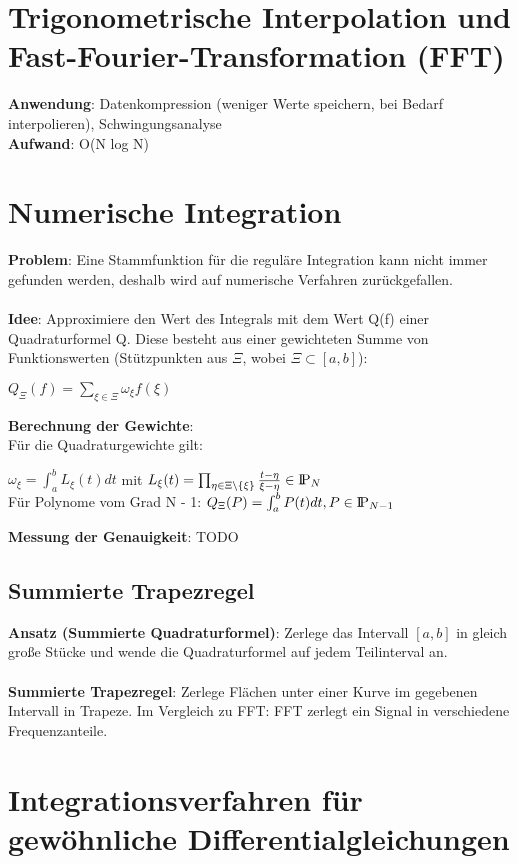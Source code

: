 \documentclass[10pt,a4paper]{article}
\def\polynomials{{\rm I\!P}}
\begin{document}
	\section{Trigonometrische Interpolation und Fast-Fourier-Transformation (FFT)}
	\textbf{Anwendung}: Datenkompression (weniger Werte speichern, bei Bedarf interpolieren), Schwingungsanalyse\\
	\textbf{Aufwand}: O(N log N)
	
	\section{Numerische Integration}
	\textbf{Problem}: Eine Stammfunktion für die reguläre Integration kann nicht immer gefunden werden, deshalb wird auf numerische Verfahren zurückgefallen.\\\\
	\textbf{Idee}: Approximiere den Wert des Integrals mit dem Wert Q(f) einer Quadraturformel Q. Diese besteht aus einer gewichteten Summe von Funktionswerten (Stützpunkten aus $\Xi$, wobei $\Xi \subset [a, b]$):
	\begin{center}
		$Q_\Xi(f) = \sum_{\xi \in \Xi}^{}\omega_\xi f(\xi)$
	\end{center}
	\textbf{Berechnung der Gewichte}:\\
	Für die Quadraturgewichte gilt:
	\begin{center}
		$\omega_\xi = \int_{a}^{b}L_\xi(t)dt$ mit $L_\xi(t) = \prod_{\eta \in \Xi \setminus \{\xi\}}^{} \frac{t - \eta}{\xi - \eta} \in \polynomials_N$\\
		Für Polynome vom Grad N - 1: $Q_\Xi(P) = \int_{a}^{b}P(t)dt, P \in \polynomials_{N - 1}$
	\end{center}
	\textbf{Messung der Genauigkeit}: TODO\\
	
	\subsection{Summierte Trapezregel}
	\textbf{Ansatz (Summierte Quadraturformel)}: Zerlege das Intervall $[a, b]$ in gleich große Stücke und wende die Quadraturformel auf jedem Teilinterval an.\\\\
	\textbf{Summierte Trapezregel}: Zerlege Flächen unter einer Kurve im gegebenen Intervall in Trapeze. Im Vergleich zu FFT: FFT zerlegt ein Signal in verschiedene Frequenzanteile.
	
	\section{Integrationsverfahren für gewöhnliche Differentialgleichungen}
\end{document}
